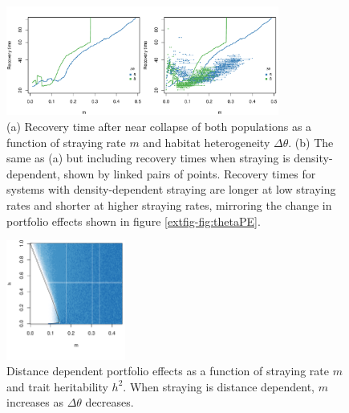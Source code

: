 \documentclass{revtex4}
\begin{document}
\begin{figure}
  \captionsetup{justification=raggedright,
singlelinecheck=false
}
\centering
\includegraphics[width=0.8\textwidth]{fig_relaxtheta2.pdf}
\caption{
(a) Recovery time after near collapse of both populations as a function of straying rate $m$ and habitat heterogeneity $\Delta\theta$.
(b) The same as (a) but including recovery times when straying is density-dependent, shown by linked pairs of points.
Recovery times for systems with density-dependent straying are longer at low straying rates and shorter at higher straying rates, mirroring the change in portfolio effects shown in figure \ref{extfig-fig:thetaPE}.
} \label{fig:relaxtheta}
\end{figure}


\begin{figure}
  \captionsetup{justification=raggedright,
singlelinecheck=false
}
  \centering
  \includegraphics[width=0.35\textwidth]{fig_MDPE_hm_mtheta_rt.pdf}
  \caption{
  Distance dependent portfolio effects as a function of straying rate $m$ and trait heritability $h^2$. When straying is distance dependent, $m$ increases as $\Delta\theta$ decreases.
  } \label{fig:mthetaPE}
\end{figure}
\end{document}
